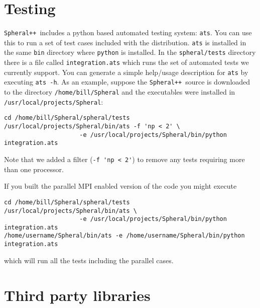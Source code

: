 \documentclass{article}
\newcommand{\Spheral}{{\tt Spheral++}}
\begin{document}
\section{Testing}
\Spheral\ includes a python based automated testing system: \verb+ats+.  You can
use this to run a set of test cases included with the distribution.  \verb+ats+
is installed in the same \verb+bin+ directory where \verb+python+ is installed.
In the \verb+spheral/tests+ directory there is a file called
\verb+integration.ats+ which runs the set of automated tests we currently
support.  You can generate a simple help/usage description for {\tt ats} by
executing \verb+ats -h+.  As an example, suppose the \Spheral\ source is
downloaded to the directory \verb./home/bill/Spheral. and the executables were
installed in \verb./usr/local/projects/Spheral.:
\begin{verbatim}
cd /home/bill/Spheral/spheral/tests
/usr/local/projects/Spheral/bin/ats -f 'np < 2' \
                     -e /usr/local/projects/Spheral/bin/python integration.ats
\end{verbatim}
Note that we added a filter (\verb+-f 'np < 2'+) to remove any tests requiring
more than one processor.

If you built the parallel MPI enabled version of the code you might execute
\begin{verbatim}
cd /home/bill/Spheral/spheral/tests
/usr/local/projects/Spheral/bin/ats \
                     -e /usr/local/projects/Spheral/bin/python integration.ats
/home/username/Spheral/bin/ats -e /home/username/Spheral/bin/python integration.ats
\end{verbatim}
which will run all the tests including the parallel cases.

\appendix
\section{Third party libraries}
\label{thirdParty.sec}
\end{document}
